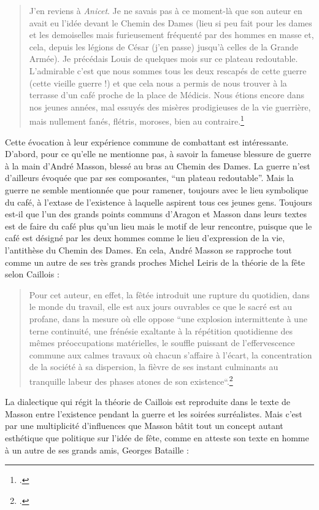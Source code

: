 \begin{quote}J’en reviens à \emph{Anicet}. Je ne savais pas à ce moment-là que son auteur en avait eu l’idée devant le Chemin des Dames (lieu si peu fait pour les dames et les demoiselles mais furieusement fréquenté par des hommes en masse et, cela, depuis les légions de César (j’en passe) jusqu’à celles de la Grande Armée). Je précédais Louis de quelques mois sur ce plateau redoutable. L’admirable c’est que nous sommes tous les deux rescapés de cette guerre (cette vieille guerre !) et que cela nous a permis de nous trouver à la terrasse d’un café proche de la place de Médicis. Nous étions encore dans nos jeunes années, mal essuyés des misères prodigieuses de la vie guerrière, mais nullement fanés, flétris, moroses, bien au contraire.\footcite[p85]{rebelle}\end{quote}

	Cette évocation à leur expérience commune de combattant est intéressante. D’abord, pour ce qu’elle ne mentionne pas, à savoir la fameuse blessure de guerre à la main d’André Masson, blessé au bras au Chemin des Dames. La guerre n’est d’ailleurs évoquée que par ses composantes, \enquote{un plateau redoutable}. Mais la guerre ne semble mentionnée que pour ramener, toujours avec le lieu symbolique du café, à l’extase de l’existence à laquelle aspirent tous ces jeunes gens. Toujours est-il que l’un des grands points communs d’Aragon et Masson dans leurs textes est de faire du café plus qu’un lieu mais le motif de leur rencontre, puisque que le café est désigné par les deux hommes comme le lieu d’expression de la vie, l’antithèse du Chemin des Dames. En cela, André Masson se rapproche tout comme un autre de ses très grands proches Michel Leiris de la théorie de la fête selon Caillois :

 \begin{quote}Pour cet auteur, en effet, la fêtée introduit une rupture du quotidien, dans le monde du travail, elle est aux jours ouvrables ce que le sacré est au profane, dans la mesure où elle oppose “une explosion intermittente à une terne continuité, une frénésie exaltante à la répétition quotidienne des mêmes préoccupations matérielles, le souffle puissant de l’effervescence commune aux calmes travaux où chacun s’affaire à l’écart, la concentration de la société à sa dispersion, la fièvre de ses instant culminants au tranquille labeur des phases atones de son existence“.\footcite[]{poitryguy}\end{quote}

	La dialectique qui régit la théorie de Caillois est reproduite dans le texte de  Masson entre l’existence pendant la guerre et les soirées surréalistes. Mais c’est par une multiplicité d’influences que Masson bâtit tout un concept autant esthétique que politique sur l’idée de fête, comme en atteste   son texte en homme à un autre de ses grands amis, Georges Bataille :
	
